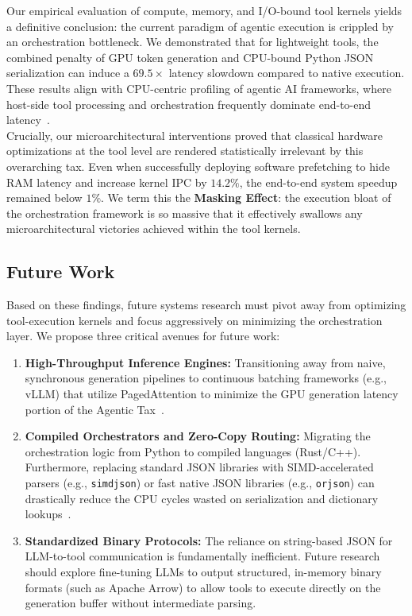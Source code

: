 \documentclass[10pt, letterpaper]{article}
\begin{document}
\noindent Our empirical evaluation of compute, memory, and I/O-bound tool kernels yields a definitive conclusion: the current paradigm of agentic execution is crippled by an orchestration bottleneck. We demonstrated that for lightweight tools, the combined penalty of GPU token generation and CPU-bound Python JSON serialization can induce a $69.5\times$ latency slowdown compared to native execution. These results align with CPU-centric profiling of agentic AI frameworks, where host-side tool processing and orchestration frequently dominate end-to-end latency~\cite{cpu_centric}. \\

\noindent Crucially, our microarchitectural interventions proved that classical hardware optimizations at the tool level are rendered statistically irrelevant by this overarching tax. Even when successfully deploying software prefetching to hide RAM latency and increase kernel IPC by $14.2\%$, the end-to-end system speedup remained below $1\%$. We term this the \textbf{Masking Effect}: the execution bloat of the orchestration framework is so massive that it effectively swallows any microarchitectural victories achieved within the tool kernels.

\subsection{Future Work}
Based on these findings, future systems research must pivot away from optimizing tool-execution kernels and focus aggressively on minimizing the orchestration layer. We propose three critical avenues for future work:

\begin{enumerate}
    \item \textbf{High-Throughput Inference Engines:} Transitioning away from naive, synchronous generation pipelines to continuous batching frameworks (e.g., vLLM) that utilize PagedAttention to minimize the GPU generation latency portion of the Agentic Tax~\cite{sutradhara, data_systems}.
    \item \textbf{Compiled Orchestrators and Zero-Copy Routing:} Migrating the orchestration logic from Python to compiled languages (Rust/C++). Furthermore, replacing standard JSON libraries with SIMD-accelerated parsers (e.g., \texttt{simdjson}) or fast native JSON libraries (e.g., \texttt{orjson}) can drastically reduce the CPU cycles wasted on serialization and dictionary lookups~\cite{simdjson}.
    \item \textbf{Standardized Binary Protocols:} The reliance on string-based JSON for LLM-to-tool communication is fundamentally inefficient. Future research should explore fine-tuning LLMs to output structured, in-memory binary formats (such as Apache Arrow) to allow tools to execute directly on the generation buffer without intermediate parsing.
\end{enumerate}
\end{document}
